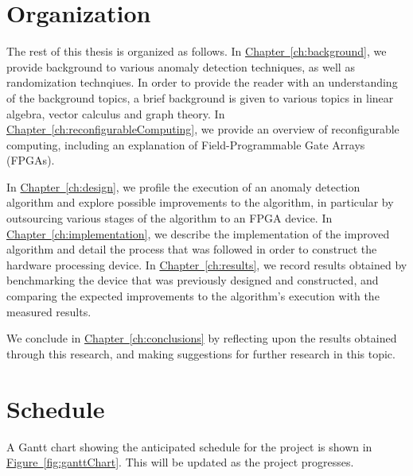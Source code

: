 \section{Organization}
\label{sec:organization}
The rest of this thesis is organized as follows. In \hyperref[ch:background]
{Chapter~\ref{ch:background}}, we provide background to various anomaly 
detection techniques, as well as randomization technqiues. In order to provide 
the reader with an understanding of the background topics, a brief background is
given to various topics in linear algebra, vector calculus and graph theory. In
\hyperref[ch:reconfigurableComputing]{Chapter~\ref{ch:reconfigurableComputing}}, 
we provide an overview of reconfigurable computing, including an explanation of 
Field-Programmable Gate Arrays (FPGAs).

In \hyperref[ch:design] {Chapter~\ref{ch:design}}, we profile the execution of 
an anomaly detection algorithm and explore possible improvements to the 
algorithm, in particular by outsourcing various stages of the algorithm to an 
FPGA device. In \hyperref[ch:implementation]{Chapter~\ref{ch:implementation}}, 
we describe the implementation of the improved algorithm and detail the process 
that was followed in order to construct the hardware processing device. In 
\hyperref[ch:results]{Chapter~\ref{ch:results}}, we record results obtained by 
benchmarking the device that was previously designed and constructed, and 
comparing the expected improvements to the algorithm's execution with the 
measured results.

We conclude in \hyperref[ch:conclusions] {Chapter~\ref{ch:conclusions}} by 
reflecting upon the results obtained through this research, and making 
suggestions for further research in this topic.
 
\section{Schedule}
\label{sec:schedule}
A Gantt chart showing the anticipated schedule for the project is shown in 
\hyperref[fig:ganttChart]{Figure~\ref{fig:ganttChart}}. This will be updated as 
the project progresses.

